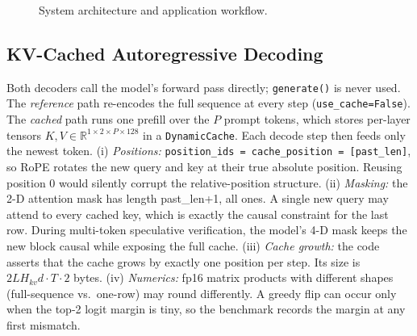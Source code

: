 \documentclass[conference]{IEEEtran}
\begin{document}
\begin{figure}[t]\centering
{}
\caption{System architecture and application workflow.}\label{fig:arch}\end{figure}

\subsection{KV-Cached Autoregressive Decoding}
Both decoders call the model's forward pass directly; \texttt{generate()} is never used.
The \emph{reference} path re-encodes the full sequence at every step (\texttt{use\_cache=False}).
The \emph{cached} path runs one prefill over the $P$ prompt tokens, which stores per-layer tensors
$K,V\in\mathbb{R}^{1\times2\times P\times128}$ in a \texttt{DynamicCache}. Each decode step then feeds only
the newest token.
(i) \emph{Positions:} \texttt{position\_ids = cache\_position = [past\_len]}, so RoPE rotates the
new query and key at their true absolute position. Reusing position 0 would silently corrupt the
relative-position structure.
(ii) \emph{Masking:} the 2-D attention mask has length past\_len+1, all ones. A single new query may
attend to every cached key, which is exactly the causal constraint for the last row. During multi-token
speculative verification, the model's 4-D mask keeps the new block causal while exposing the full cache.
(iii) \emph{Cache growth:} the code asserts that the cache grows by exactly one position per step.
Its size is $2LH_{kv}d\cdot T\cdot2$ bytes.
(iv) \emph{Numerics:} fp16 matrix products with different shapes (full-sequence vs.\ one-row) may
round differently. A greedy flip can occur only when the top-2 logit margin is tiny, so the benchmark
records the margin at any first mismatch.
\end{document}
